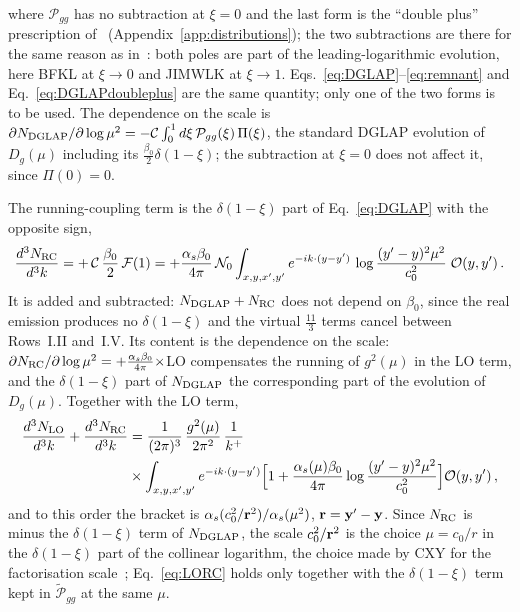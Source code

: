 where $\mathcal P_{gg}$ has no subtraction at $\xi=0$ and the last form is the ``double plus'' prescription of~\cite{Kovner:2023vsy} (Appendix~\ref{app:distributions}); the two subtractions are there for the same reason as in~\cite{Kovner:2023vsy}: both poles are part of the leading-logarithmic evolution, here BFKL at $\xi\to0$ and JIMWLK at $\xi\to1$. Eqs.~\eqref{eq:DGLAP}--\eqref{eq:remnant} and Eq.~\eqref{eq:DGLAPdoubleplus} are the same quantity; only one of the two forms is to be used. The dependence on the scale is $\partial N_{\rm DGLAP}/\partial\log\mu^2=-\mathcal C\int_0^1d\xi\,\mathcal P_{gg}(\xi)\,\Pi(\xi)$, the standard DGLAP evolution of $D_g(\mu)$ including its $\frac{\beta_0}{2}\delta(1-\xi)$; the subtraction at $\xi=0$ does not affect it, since $\Pi(0)=0$.

The running-coupling term is the $\delta(1-\xi)$ part of Eq.~\eqref{eq:DGLAP} with the opposite sign,
\begin{align}\label{eq:RC}
\frac{d^3N_{\rm RC}}{d^3k}=+\,\mathcal C\,\frac{\beta_0}{2}\,\mathcal F(1)=+\frac{\alpha_s\beta_0}{4\pi}\,\mathcal N_0\int_{x,y,x',y'}e^{-ik\cdot(y-y')}\,\log\frac{(y'-y)^2\mu^2}{c_0^2}\;\mathcal O(y,y')\,.
\end{align}
It is added and subtracted: $N_{\rm DGLAP}+N_{\rm RC}$ does not depend on $\beta_0$, since the real emission produces no $\delta(1-\xi)$ and the virtual $\frac{11}{3}$ terms cancel between Rows~I.II and~I.V. Its content is the dependence on the scale: $\partial N_{\rm RC}/\partial\log\mu^2=+\frac{\alpha_s\beta_0}{4\pi}\times$LO compensates the running of $g^2(\mu)$ in the LO term, and the $\delta(1-\xi)$ part of $N_{\rm DGLAP}$ the corresponding part of the evolution of $D_g(\mu)$. Together with the LO term,
\begin{align}\label{eq:LORC}
\frac{d^3N_{\rm LO}}{d^3k}+\frac{d^3N_{\rm RC}}{d^3k}&=\frac{1}{(2\pi)^3}\,\frac{g^2(\mu)}{2\pi^2}\,\frac{1}{k^+}\notag\\&\times\int_{x,y,x',y'}e^{-ik\cdot(y-y')}\Big[1+\frac{\alpha_s(\mu)\beta_0}{4\pi}\log\frac{(y'-y)^2\mu^2}{c_0^2}\Big]\mathcal O(y,y')\,,
\end{align}
and to this order the bracket is $\alpha_s(c_0^2/\mathbf{r}^2)/\alpha_s(\mu^2)$, $\mathbf{r}=\mathbf{y}'-\mathbf{y}$. Since $N_{\rm RC}$ is minus the $\delta(1-\xi)$ term of $N_{\rm DGLAP}$, the scale $c_0^2/\mathbf{r}^2$ is the choice $\mu=c_0/r$ in the $\delta(1-\xi)$ part of the collinear logarithm, the choice made by CXY for the factorisation scale~\cite{Chirilli:2012jd}; Eq.~\eqref{eq:LORC} holds only together with the $\delta(1-\xi)$ term kept in $\widetilde{\mathcal P}_{gg}$ at the same $\mu$.

